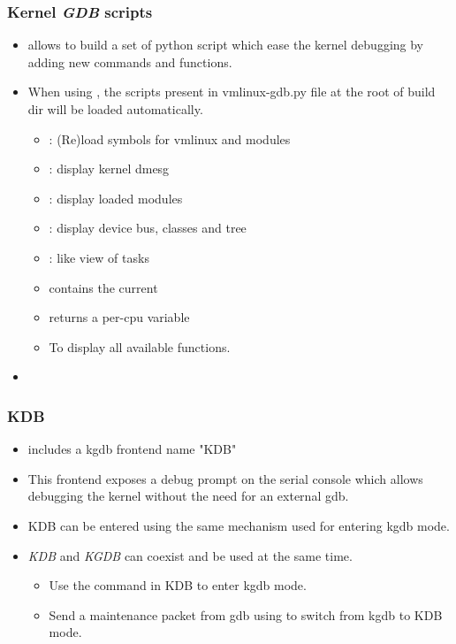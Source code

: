 \begin{frame}
  \frametitle{Kernel {\em GDB} scripts}
  \begin{itemize}
    \item {} allows to build a set of python script
          which ease the kernel debugging by adding new commands and functions.
    \item When using , the scripts present in vmlinux-gdb.py
          file at the root of build dir will be loaded automatically.
    \begin{itemize}
      \item {}: (Re)load symbols for vmlinux and modules
      \item {}: display kernel dmesg
      \item {}: display loaded modules
      \item {}: display device bus, classes and
            tree
      \item {}:  like view of tasks
      \item {} contains the current 
      \item {} returns a per-cpu variable
      \item {} To display all available functions.
    \end{itemize}
    \item {}
  \end{itemize}
\end{frame}

\begin{frame}
  \frametitle{KDB}
  \begin{itemize}
    \item {} includes a kgdb frontend name "KDB"
    \item This frontend exposes a debug prompt on the serial console which
          allows debugging the kernel without the need for an external gdb.
    \item KDB can be entered using the same mechanism used for entering kgdb
          mode.
    \item {\em KDB} and {\em KGDB} can coexist and be used at the same time.
    \begin{itemize}
      \item Use the  command in KDB to enter kgdb mode.
      \item Send a maintenance packet from gdb using 
            to switch from kgdb to KDB mode.
    \end{itemize}
  \end{itemize}
\end{frame}

